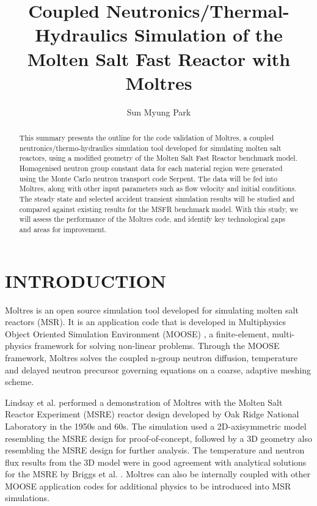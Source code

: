 \documentclass{anstrans}
\title{Coupled Neutronics/Thermal-Hydraulics Simulation of the Molten Salt Fast Reactor with Moltres}
\author{Sun Myung Park}
\institute{Dept. of Nuclear, Plasma and Radiological Engineering, University of Illinois at Urbana-Champaign \\
smpark3@illinois.edu}
\begin{document}
\begin{abstract}
This summary presents the outline for the code validation of Moltres, a coupled neutronics/thermo-hydraulics simulation tool developed for simulating molten salt reactors, using a modified geometry of the Molten Salt Fast Reactor benchmark model. Homogenised neutron group constant data for each material region were generated using the Monte Carlo neutron transport code Serpent. The data will be fed into Moltres, along with other input parameters such as flow velocity and initial conditions. The steady state and selected accident transient simulation results will be studied and compared against existing results for the MSFR benchmark model. With this study, we will assess the performance of the Moltres code, and identify key technological gaps and areas for improvement.
\end{abstract}

\section{INTRODUCTION}

Moltres is an open source simulation tool developed for simulating molten salt reactors (MSR). It is an application code that is developed in Multiphysics Object Oriented Simulation Environment (MOOSE) \cite{gaston_moose:_2009}, a finite-element, multi-physics framework for solving non-linear problems. Through the MOOSE framework, Moltres solves the coupled n-group neutron diffusion, temperature and delayed neutron precursor governing equations on a coarse, adaptive meshing scheme. 

Lindsay et al. \cite{lindsay_introduction_2018} performed a demonstration of Moltres with the Molten Salt Reactor Experiment (MSRE) reactor design developed by Oak Ridge National Laboratory in the 1950s and 60s. The simulation used a 2D-axisymmetric model resembling the MSRE design for proof-of-concept, followed by a 3D geometry also resembling the MSRE design for further analysis. The temperature and neutron flux results from the 3D model were in good agreement with analytical solutions for the MSRE by Briggs et al. \cite{briggs_molten-salt_1964}. Moltres can also be internally coupled with other MOOSE application codes for additional physics to be introduced into MSR simulations.

\end{document}
